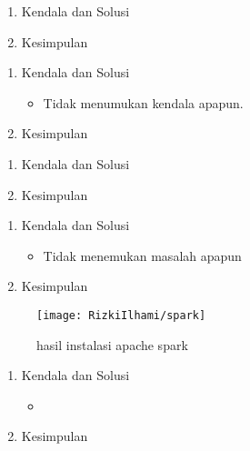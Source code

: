 
\begin{enumerate}
\item Kendala dan Solusi

\item Kesimpulan

\end{enumerate}


\begin{enumerate}
\item Kendala dan Solusi

\begin{itemize}
\item Tidak menumukan kendala apapun.
\end{itemize}

\item Kesimpulan

\end{enumerate}

\begin{enumerate}
\item Kendala dan Solusi

\item Kesimpulan

\end{enumerate}

\begin{enumerate}
\item Kendala dan Solusi

\begin{itemize}
\item Tidak menemukan masalah apapun
\end{itemize}


\item Kesimpulan

\end{enumerate}

\begin{figure}[!ht]
\texttt{[image: RizkiIlhami/spark]}
\caption{hasil instalasi apache spark }
\label{gam:hasil instalasi spark}
\end{figure}

\begin{enumerate}
\item Kendala dan Solusi

\begin{itemize}
\item 
\end{itemize}


\item Kesimpulan

\end{enumerate}

